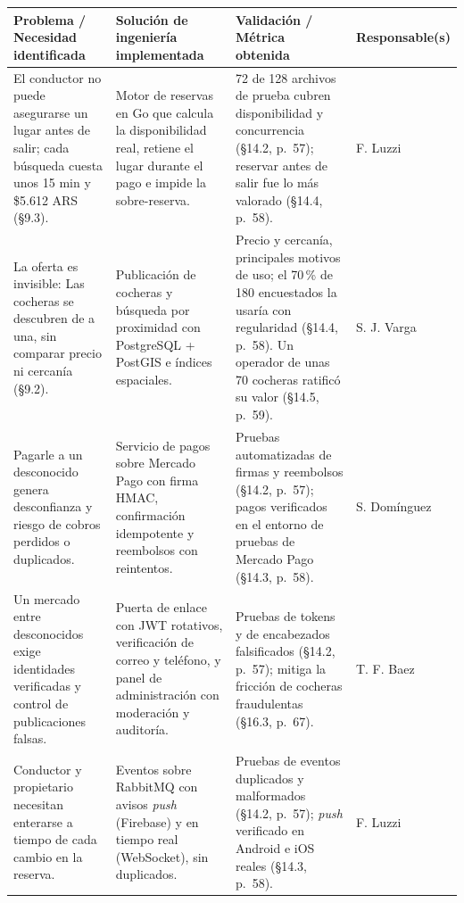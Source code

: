 \documentclass[11pt,letterpaper]{article}
\newcommand{\fsection}[1]{\par\Needspace{8\baselineskip}\vspace{1.4ex}{\large\bfseries #1}\par\vspace{0.6ex}}
\newcommand{\thead}[1]{\cellcolor{tplblue}\color{tpltext}\bfseries #1}
\begin{document}
\fsection{2. Matriz de Contribuciones y Resultados}

{\renewcommand{\arraystretch}{1.2}
\begin{xltabular}{\linewidth}{|L{3.45cm}|Y|Y|L{2.9cm}|}
\hline
\thead{Problema / Necesidad identificada} & \thead{Solución de ingeniería implementada} & \thead{Validación / Métrica obtenida} & \thead{Responsable(s)} \\ \hline
\endhead
El conductor no puede asegurarse un lugar antes de salir; cada búsqueda cuesta unos 15 min y \$5.612 ARS (§9.3). &
Motor de reservas en Go que calcula la disponibilidad real, retiene el lugar durante el pago e impide la sobre-reserva. &
72 de 128 archivos de prueba cubren disponibilidad y concurrencia (§14.2, p.~57); reservar antes de salir fue lo más valorado (§14.4, p.~58). &
F. Luzzi \\ \hline
La oferta es invisible: Las cocheras se descubren de a una, sin comparar precio ni cercanía (§9.2). &
Publicación de cocheras y búsqueda por proximidad con PostgreSQL + PostGIS e índices espaciales. &
Precio y cercanía, principales motivos de uso; el 70\,\% de 180 encuestados la usaría con regularidad (§14.4, p.~58). Un operador de unas 70 cocheras ratificó su valor (§14.5, p.~59). &
S. J. Varga \\ \hline
Pagarle a un desconocido genera desconfianza y riesgo de cobros perdidos o duplicados. &
Servicio de pagos sobre Mercado Pago con firma HMAC, confirmación idempotente y reembolsos con reintentos. &
Pruebas automatizadas de firmas y reembolsos (§14.2, p.~57); pagos verificados en el entorno de pruebas de Mercado Pago (§14.3, p.~58). &
S. Domínguez \\ \hline
Un mercado entre desconocidos exige identidades verificadas y control de publicaciones falsas. &
Puerta de enlace con JWT rotativos, verificación de correo y teléfono, y panel de administración con moderación y auditoría. &
Pruebas de tokens y de encabezados falsificados (§14.2, p.~57); mitiga la fricción de cocheras fraudulentas (§16.3, p.~67). &
T. F. Baez \\ \hline
Conductor y propietario necesitan enterarse a tiempo de cada cambio en la reserva. &
Eventos sobre RabbitMQ con avisos \textit{push} (Firebase) y en tiempo real (WebSocket), sin duplicados. &
Pruebas de eventos duplicados y malformados (§14.2, p.~57); \textit{push} verificado en Android e iOS reales (§14.3, p.~58). &
F. Luzzi \\ \hline
\end{xltabular}}
\end{document}
